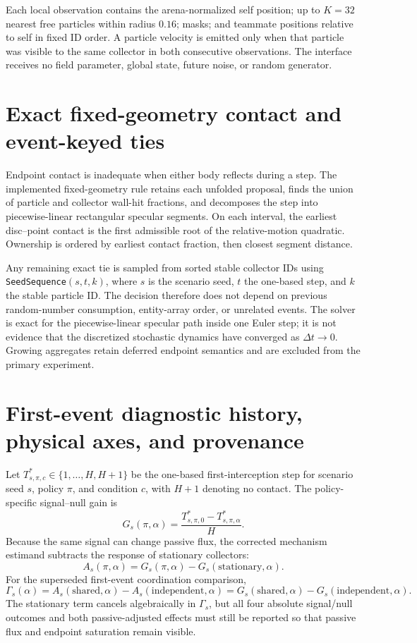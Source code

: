 \documentclass{article}
\begin{document}
Each local observation contains the arena-normalized self position; up to
\(K=32\) nearest free particles within radius \(0.16\); masks; and teammate
positions relative to self in fixed ID order. A particle velocity is emitted
only when that particle was visible to the same collector in both consecutive
observations. The interface receives no field parameter, global state, future
noise, or random generator.

\section{Exact fixed-geometry contact and event-keyed ties}

Endpoint contact is inadequate when either body reflects during a step. The
implemented fixed-geometry rule retains each unfolded proposal, finds the union
of particle and collector wall-hit fractions, and decomposes the step into
piecewise-linear rectangular specular segments. On each interval, the earliest
disc--point contact is the first admissible root of the relative-motion
quadratic. Ownership is ordered by earliest contact fraction, then closest
segment distance.

Any remaining exact tie is sampled from sorted stable collector IDs using
\texttt{SeedSequence}$(s,t,k)$, where \(s\) is the scenario seed, \(t\) the
one-based step, and \(k\) the stable particle ID. The decision therefore does
not depend on previous random-number consumption, entity-array order, or
unrelated events. The solver is exact for the piecewise-linear specular path
inside one Euler step; it is not evidence that the discretized stochastic
dynamics have converged as \(\Delta t\to0\). Growing aggregates retain deferred
endpoint semantics and are excluded from the primary experiment.

\section{First-event diagnostic history, physical axes, and provenance}

Let \(T^*_{s,\pi,c}\in\{1,\ldots,H,H+1\}\) be the one-based
first-interception step for scenario seed \(s\), policy \(\pi\), and condition
\(c\), with \(H+1\) denoting no contact. The policy-specific signal--null gain
is
\[
 G_s(\pi,\alpha)=
 \frac{T^*_{s,\pi,0}-T^*_{s,\pi,\alpha}}{H}.
\]
Because the same signal can change passive flux, the corrected mechanism
estimand subtracts the response of stationary collectors:
\[
 A_s(\pi,\alpha)=G_s(\pi,\alpha)-G_s(\mathrm{stationary},\alpha).
\]
For the superseded first-event coordination comparison,
\[
 \Gamma_s(\alpha)=A_s(\mathrm{shared},\alpha)
 -A_s(\mathrm{independent},\alpha)
 =G_s(\mathrm{shared},\alpha)-G_s(\mathrm{independent},\alpha).
\]
The stationary term cancels algebraically in \(\Gamma_s\), but all four
absolute signal/null outcomes and both passive-adjusted effects must still be
reported so that passive flux and endpoint saturation remain visible.
\end{document}
